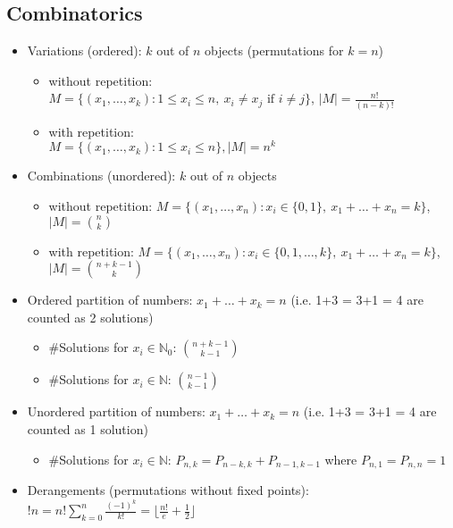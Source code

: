 \documentclass[9pt]{article}   	%
\begin{document}
\subsection{Combinatorics}
\begin{itemize}
\item Variations (ordered): $k$ out of $n$ objects {\footnotesize (permutations for $k = n$)}
\begin{itemize}
	\item without repetition:\\ $M = \{ (x_{1}, \ldots , x_{k}): 1 \leq x_i \leq n, \ x_i \neq x_j \mbox{ if } i \neq j \}$, $|M|= \frac{n!}{(n-k)!}$
	\item with repetition:\\ $M = \{ (x_{1}, \ldots , x_{k}): 1 \leq x_i \leq n \}, |M| = n^k$
	\end{itemize}
\item Combinations (unordered): $k$ out of $n$ objects
\begin{itemize}
	\item without repetition: $M = \{ (x_{1}, \ldots , x_{n}): x_i \in \{0,1\}, \ x_1 + \ldots + x_n = k \}$, $|M| = {n \choose k}$
	\item with repetition: $M = \{ (x_{1}, \ldots , x_{n}): x_i \in \{0,1,\ldots,k\}, \ x_1 + \ldots + x_n = k \}$, $|M| = {n+k-1 \choose k}$
\end{itemize}
\item Ordered partition of numbers: $x_1+\ldots+x_k = n$ {\footnotesize (i.e. 1+3 = 3+1 = 4 are counted as 2 solutions)}
\begin{itemize}
	\item \#Solutions for $x_i \in \mathbb{N}_0$: ${n+k-1 \choose k-1}$
	\item \#Solutions for $x_i \in \mathbb{N}$: ${n-1 \choose k-1}$
\end{itemize}
\item Unordered partition of numbers: $x_1+\ldots+x_k = n$ {\footnotesize (i.e. 1+3 = 3+1 = 4 are counted as 1 solution)}
\begin{itemize}
	\item \#Solutions for $x_i \in \mathbb{N}$: $P_{n,k} = P_{n-k,k}+P_{n-1,k-1}$ where $P_{n,1} = P_{n,n} = 1$
\end{itemize}
\item Derangements {\footnotesize (permutations without fixed points)}: $!n = n! \sum\nolimits_{k = 0}^n \frac{(-1)^k}{k!} = \lfloor \frac{n!}{e} + \frac{1}{2} \rfloor$
\end{itemize}
\end{document}
